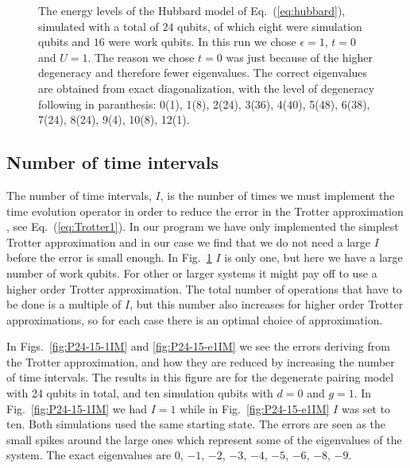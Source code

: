 \documentclass[aps,pra,twocolumn,floatfix]{revtex4}
\begin{document}
\begin{figure}[h!]
\begin{center}
	\caption{The energy levels of  the Hubbard model of Eq.~(\ref{eq:hubbard}),
          simulated with a total of $24$ qubits, of which eight were
          simulation qubits and $16$ were work qubits.
          In this run  we chose 
          $\epsilon=1$, $t=0$ and $U=1$. The reason we chose $t=0$ was just
          because of the higher degeneracy and therefore fewer
          eigenvalues. The correct eigenvalues are obtained from exact
          diagonalization, with the level of degeneracy following in
          paranthesis: 0(1), 1(8), 2(24), 3(36), 4(40), 5(48), 6(38),
          7(24), 8(24), 9(4), 10(8), 12(1).  
        }
	\label{fig:24-17-1T0}
\end{center} 
\end{figure}


\subsection{Number of time intervals}

The number of time intervals, $I$, is the number of times we must 
implement the time evolution operator in order to reduce the error in the
Trotter approximation  \cite{trotter1959,suzukitrotter,suzuki1985}, 
see Eq.~(\ref{eq:Trotter1}).
In our program we have only implemented the simplest Trotter
approximation and in our case we find that we do not need a large $I$
before the error is small enough. In Fig.~\ref{fig:24-17-1T0} 
$I$ is only one, but here we have a large number of work qubits.
For other or larger systems it
might pay off to use a higher order Trotter approximation. The total
number of operations that have to be done is a multiple of $I$, but 
this number
also increases for higher order Trotter approximations, so for each
case there is an optimal choice of approximation.

In Figs.~\ref{fig:P24-15-1IM} and \ref{fig:P24-15-e1IM} we 
see the errors deriving from the Trotter approximation, and how they
are reduced by increasing the number of time intervals. The results in this figure are
for the degenerate pairing model  with 24 qubits in total, and ten
simulation qubits with $d=0$ and $g=1$. In Fig.~\ref{fig:P24-15-1IM}
we had $I=1$ while in Fig.~\ref{fig:P24-15-e1IM} $I$ was set to ten. Both
simulations used the same starting state. The errors are seen as the
small spikes around the large ones which represent some of the
eigenvalues of the system. The exact eigenvalues are  $0$, $-1$,
$-2$,  $-3$, $-4$, $-5$, $-6$, $-8$, $ -9$. 
\end{document}
